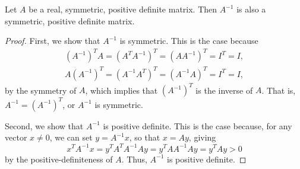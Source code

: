\documentclass[newpage]{homework}
\begin{document}
	\question Let $A$ be a real, symmetric, positive definite matrix. Then $A^{-1}$ is also a symmetric, positive definite matrix.
	\begin{proof}
		First, we show that $A^{-1}$ is symmetric. This is the case because
		\begin{gather*}
			\left(A^{-1}\right)^TA = \left(A^TA^{-1}\right)^T = \left(AA^{-1}\right)^T = I^T = I,\\
			A\left(A^{-1}\right)^T = \left(A^{-1}A^T\right)^T = \left(A^{-1}A\right)^T = I^T = I,
		\end{gather*}
		by the symmetry of $A$, which implies that $\left(A^{-1}\right)^T$ is the inverse of $A$. That is, $A^{-1} = \left(A^{-1}\right)^T$, or $A^{-1}$ is symmetric.
		
		Second, we show that $A^{-1}$ is positive definite. This is the case because, for any vector $x \ne 0$, we can set $y = A^{-1}x$, so that $x = Ay$, giving
		\begin{equation*}
			x^TA^{-1}x = y^TA^TA^{-1}Ay = y^TAA^{-1}Ay = y^TAy > 0
		\end{equation*}
		by the positive-definiteness of $A$. Thus, $A^{-1}$ is positive definite.
	\end{proof}
\end{document}
